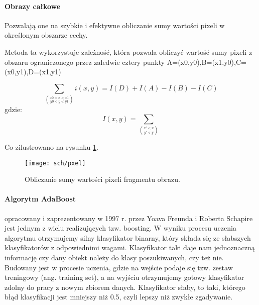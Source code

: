 \paragraph{Obrazy całkowe}
Pozwalają one na szybkie i efektywne obliczanie sumy wartości pixeli w określonym obszarze cechy.

Metoda ta wykorzystuje zależność, która pozwala obliczyć wartość sumy pixeli z obszaru ograniczonego przez zaledwie cztery punkty A=(x0,y0),B=(x1,y0),C=(x0,y1),D=(x1,y1) 

$$ \sum_{\binom{x0<x<x1}{y0<y<y1}} i(x,y) = I(D) + I(A) -I(B) - I(C)$$
gdzie:
$$ I(x,y) = \sum_{\binom{x'<x}{y'<y}}$$

Co zilustrowano na rysunku \ref{fig:sch2}.
\begin{figure}[bth]
\centering
{\texttt{[image: sch/pxel]}}
\caption[ Obliczanie sumy wartości pixeli fragmentu obrazu]{Obliczanie sumy wartości pixeli fragmentu obrazu.}
\label{fig:sch2}
\end{figure}




\paragraph{Algorytm AdaBoost} opracowany i zaprezentowany w 1997 r. przez Yoava Freunda i Roberta Schapire jest jednym z wielu realizujących tzw. boosting. W wyniku procesu uczenia algorytmu otrzymujemy silny klasyfikator binarny, który składa się ze słabszych klasyfikatorów z odpowiednimi wagami. Klasyfikator taki daje nam jednoznaczną informację czy dany obiekt należy do klasy poszukiwanych, czy też nie. Budowany jest w procesie uczenia, gdzie na wejście podaje się tzw. zestaw treningowy (ang. training set), a na wyjściu otrzymujemy gotowy klasyfikator zdolny do pracy z nowym zbiorem danych.
Klasyfikator słaby, to taki, którego błąd klasyfikacji jest mniejszy niż 0.5, czyli lepszy niż zwykłe zgadywanie.

